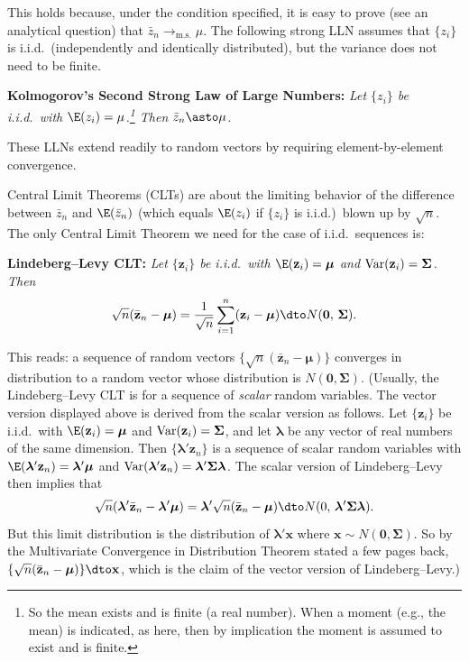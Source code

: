 \medskip
This holds because, under the condition specified, it is easy to prove (see an
analytical question) that $\bar{z}_n \to_{\text{m.s.}} \mu$.  The following strong
LLN assumes that $\{z_i\}$ is i.i.d.\ (independently and identically distributed),
but the variance does not need to be finite.

\medskip
\noindent\textbf{Kolmogorov's Second Strong Law of Large Numbers:}\quad
\emph{Let $\{z_i\}$ be i.i.d.\ with $\E(z_i) = \mu$.\footnote{So the mean exists
and is finite (a real number).  When a moment (e.g., the mean) is indicated, as
here, then by implication the moment is assumed to exist and is finite.}
Then $\bar{z}_n \asto \mu$.}

\medskip
These LLNs extend readily to random vectors by requiring element-by-element
convergence.

Central Limit Theorems (CLTs) are about the limiting behavior of the difference
between $\bar{z}_n$ and $\E(\bar{z}_n)$ (which equals $\E(z_i)$ if $\{z_i\}$ is
i.i.d.)\ blown up by $\sqrt{n}$.  The only Central Limit Theorem we need for the
case of i.i.d.\ sequences is:

\medskip
\noindent\textbf{Lindeberg--Levy CLT:}\quad
\emph{Let $\{\mathbf{z}_i\}$ be i.i.d.\ with
$\E(\mathbf{z}_i) = \bm{\mu}$ and $\operatorname{Var}(\mathbf{z}_i) = \bm{\Sigma}$.  Then}
\[
  \sqrt{n}(\bar{\mathbf{z}}_n - \bm{\mu})
  = \frac{1}{\sqrt{n}} \sum_{i=1}^{n} (\mathbf{z}_i - \bm{\mu})
  \dto N(\mathbf{0},\, \bm{\Sigma}).
\]

This reads: a sequence of random vectors
$\{\sqrt{n}(\bar{\mathbf{z}}_n - \bm{\mu})\}$ converges in distribution to a random
vector whose distribution is $N(\mathbf{0}, \bm{\Sigma})$.  (Usually, the
Lindeberg--Levy CLT is for a sequence of \emph{scalar} random variables.  The
vector version displayed above is derived from the scalar version as follows.
Let $\{\mathbf{z}_i\}$ be i.i.d.\ with $\E(\mathbf{z}_i) = \bm{\mu}$ and
$\operatorname{Var}(\mathbf{z}_i) = \bm{\Sigma}$, and let $\bm{\lambda}$ be any vector of real
numbers of the same dimension.  Then $\{\bm{\lambda}'\mathbf{z}_n\}$ is a sequence
of scalar random variables with $\E(\bm{\lambda}'\mathbf{z}_n) = \bm{\lambda}'\bm{\mu}$
and $\operatorname{Var}(\bm{\lambda}'\mathbf{z}_n) = \bm{\lambda}'\bm{\Sigma}\bm{\lambda}$.  The
scalar version of Lindeberg--Levy then implies that
\[
  \sqrt{n}(\bm{\lambda}'\bar{\mathbf{z}}_n - \bm{\lambda}'\bm{\mu})
  = \bm{\lambda}'\sqrt{n}(\bar{\mathbf{z}}_n - \bm{\mu})
  \dto N(0,\, \bm{\lambda}'\bm{\Sigma}\bm{\lambda}).
\]
But this limit distribution is the distribution of $\bm{\lambda}'\mathbf{x}$ where
$\mathbf{x} \sim N(\mathbf{0}, \bm{\Sigma})$.  So by the Multivariate Convergence
in Distribution Theorem stated a few pages back,
$\{\sqrt{n}(\bar{\mathbf{z}}_n - \bm{\mu})\} \dto \mathbf{x}$, which is the claim
of the vector version of Lindeberg--Levy.)
